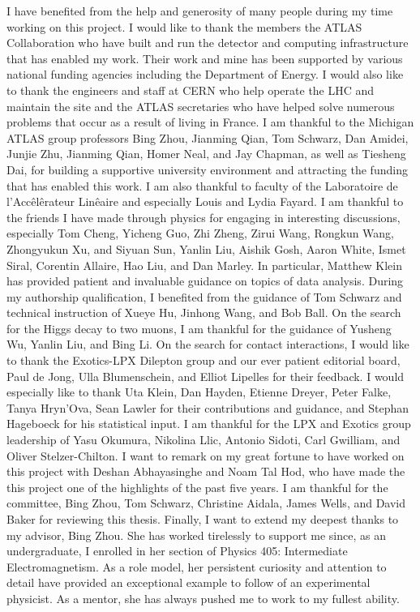 I have benefited from the help and generosity of many people during my time working on this project.
I would like to thank the members the ATLAS Collaboration who have built and run the detector and computing infrastructure that has enabled my work.
Their work and mine has been supported by various national funding agencies including the Department of Energy.
I would also like to thank the engineers and staff at CERN who help operate the LHC and maintain the site and the ATLAS secretaries who have helped solve numerous problems that occur as a result of living in France.
I am thankful to the Michigan ATLAS group professors Bing Zhou, Jianming Qian, Tom Schwarz, Dan Amidei, Junjie Zhu, Jianming Qian, Homer Neal, and Jay Chapman, as well as Tiesheng Dai, for building a supportive university environment and attracting the funding that has enabled this work.
I am also thankful to faculty of the Laboratoire de l'Acc\^el\^erateur Lin\^eaire and especially Louis and Lydia Fayard.
I am thankful to the friends I have made through physics for engaging in interesting discussions, especially Tom Cheng, Yicheng Guo, Zhi Zheng, Zirui Wang, Rongkun Wang, Zhongyukun Xu, and Siyuan Sun, Yanlin Liu, Aishik Gosh, Aaron White, Ismet Siral, Corentin Allaire, Hao Liu, and Dan Marley.
In particular, Matthew Klein has provided patient and invaluable guidance on topics of data analysis.
During my authorship qualification, I benefited from the guidance of Tom Schwarz and technical instruction of Xueye Hu, Jinhong Wang, and Bob Ball.
On the search for the Higgs decay to two muons, I am thankful for the guidance of Yusheng Wu, Yanlin Liu, and Bing Li.
On the search for contact interactions, I would like to thank the Exotics-LPX Dilepton group and our ever patient editorial board, Paul de Jong, Ulla Blumenschein, and Elliot Lipelles for their feedback.
I would especially like to thank Uta Klein, Dan Hayden, Etienne Dreyer, Peter Falke, Tanya Hryn'Ova, Sean Lawler for their contributions and guidance, and Stephan Hageboeck for his statistical input.
I am thankful for the LPX and Exotics group leadership of Yasu Okumura, Nikolina Llic, Antonio Sidoti, Carl Gwilliam, and Oliver Stelzer-Chilton.
I want to remark on my great fortune to have worked on this project with Deshan Abhayasinghe and Noam Tal Hod, who have made the this project one of the highlights of the past five years.
I am thankful for the committee, Bing Zhou, Tom Schwarz, Christine Aidala, James Wells, and David Baker for reviewing this thesis.
Finally, I want to extend my deepest thanks to my advisor, Bing Zhou.
She has worked tirelessly to support me since, as an undergraduate, I enrolled in her section of Physics 405: Intermediate Electromagnetism.
As a role model, her persistent curiosity and attention to detail have provided an exceptional example to follow of an experimental physicist. 
As a mentor, she has always pushed me to work to my fullest ability.


